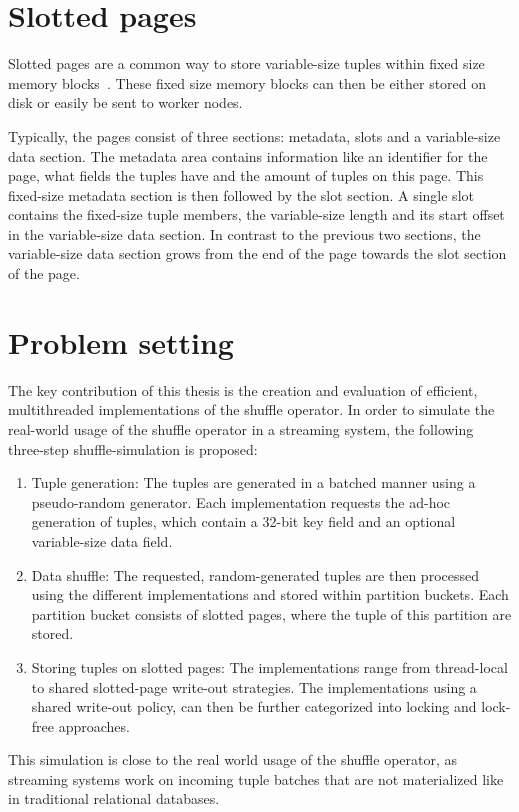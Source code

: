 \section{Slotted pages}
Slotted pages are a common way to store variable-size tuples within fixed size memory blocks~\parencite{Data-page-layouts-for-relational-databases}.
These fixed size memory blocks can then be either stored on disk or easily be sent to worker nodes.

Typically, the pages consist of three sections: metadata, slots and a variable-size data section.
The metadata area contains information like an identifier for the page, what fields the tuples have and the amount of tuples on this page.
This fixed-size metadata section is then followed by the slot section.
A single slot contains the fixed-size tuple members, the variable-size length and its start offset in the variable-size data section.
In contrast to the previous two sections, the variable-size data section grows from the end of the page towards the slot section of the page.

\section{Problem setting}
The key contribution of this thesis is the creation and evaluation of efficient, multithreaded implementations of the shuffle operator.
In order to simulate the real-world usage of the shuffle operator in a streaming system, the following three-step shuffle-simulation is proposed:

\begin{enumerate}
  \item Tuple generation: The tuples are generated in a batched manner using a pseudo-random generator.
        Each implementation requests the ad-hoc generation of tuples, which contain a 32-bit key field and an optional variable-size data field.

  \item Data shuffle: The requested, random-generated tuples are then processed using the different implementations and stored within partition buckets.
        Each partition bucket consists of slotted pages, where the tuple of this partition are stored.

  \item Storing tuples on slotted pages: The implementations range from thread-local to shared slotted-page write-out strategies.
        The implementations using a shared write-out policy, can then be further categorized into locking and lock-free approaches.
\end{enumerate}
This simulation is close to the real world usage of the shuffle operator, as streaming systems work on incoming tuple batches that are not materialized like in traditional relational databases.

